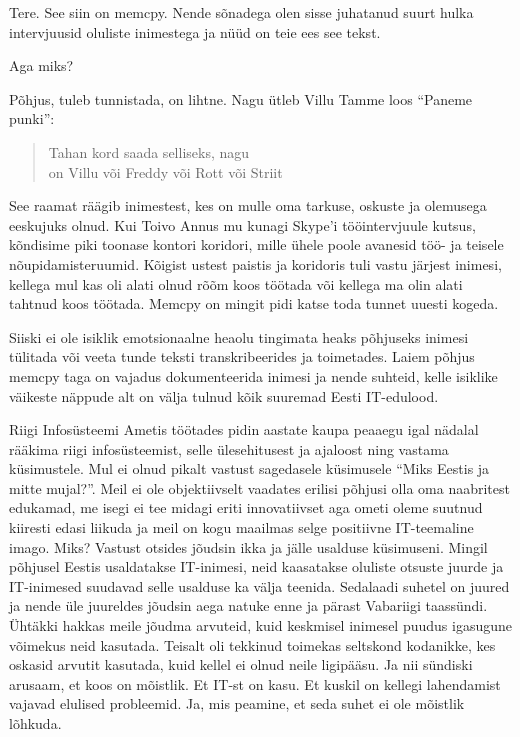 Tere. See siin on memcpy. Nende sõnadega olen sisse juhatanud suurt hulka 
intervjuusid oluliste inimestega ja nüüd on teie ees see tekst. 

Aga miks? 

Põhjus, tuleb tunnistada, on lihtne. Nagu ütleb Villu Tamme loos 
\enquote{Paneme punki}:

\begin{verse}
Tahan kord saada selliseks, nagu \\
on Villu või Freddy või Rott või Striit\\
\end{verse}

See raamat räägib inimestest, kes on mulle oma tarkuse, oskuste ja olemusega 
eeskujuks olnud. Kui Toivo Annus mu kunagi Skype'i 
tööintervjuule kutsus, kõndisime piki toonase kontori koridori, mille ühele 
poole avanesid töö- ja teisele nõupidamisteruumid. Kõigist ustest paistis ja 
koridoris tuli vastu järjest inimesi, kellega mul kas oli alati olnud rõõm koos 
töötada või kellega ma olin alati tahtnud koos töötada. Memcpy on mingit pidi 
katse toda tunnet uuesti kogeda.

Siiski ei ole isiklik emotsionaalne heaolu tingimata heaks põhjuseks inimesi 
tülitada või veeta tunde teksti transkribeerides ja toimetades. Laiem põhjus 
memcpy taga on vajadus dokumenteerida inimesi ja nende suhteid, kelle isiklike 
väikeste näppude alt on välja tulnud kõik suuremad Eesti IT-edulood. 

Riigi Infosüsteemi Ametis töötades pidin aastate 
kaupa peaaegu igal nädalal rääkima riigi infosüsteemist, selle ülesehitusest ja 
ajaloost ning vastama küsimustele. Mul ei olnud pikalt vastust sagedasele 
küsimusele \enquote{Miks Eestis ja mitte mujal?}. Meil ei ole objektiivselt 
vaadates erilisi põhjusi olla oma naabritest edukamad, me isegi ei tee midagi 
eriti innovatiivset aga ometi oleme suutnud kiiresti edasi liikuda ja meil on 
kogu maailmas selge positiivne IT-teemaline imago. Miks? Vastust otsides 
jõudsin ikka ja jälle usalduse küsimuseni. Mingil põhjusel Eestis usaldatakse 
IT-inimesi, neid kaasatakse oluliste otsuste juurde ja IT-inimesed suudavad 
selle usalduse ka välja teenida. Sedalaadi suhetel on juured ja nende üle 
juureldes jõudsin aega natuke enne ja pärast Vabariigi taassündi. Ühtäkki 
hakkas meile jõudma arvuteid, kuid keskmisel inimesel puudus igasugune võimekus 
neid kasutada. Teisalt oli tekkinud toimekas seltskond kodanikke, kes oskasid 
arvutit kasutada, kuid kellel ei olnud neile ligipääsu. Ja nii sündiski 
arusaam, et koos on mõistlik. Et IT-st on kasu. Et kuskil on kellegi 
lahendamist vajavad elulised probleemid. Ja, mis peamine, et seda suhet ei ole 
mõistlik lõhkuda. 

